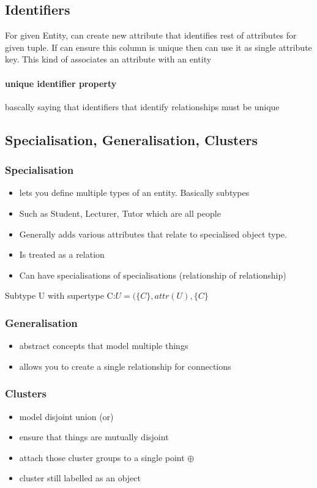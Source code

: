 \documentclass{article}
\newcommand\tab[1][0.5cm]{\hspace*{#1}}
\begin{document}
	\subsection{Identifiers}
		For given Entity, can create new attribute that identifies rest of attributes for given tuple. If can ensure this column is unique then can use it as single attribute key. This kind of associates an attribute with an entity

		\paragraph{unique identifier property} bascally saying that identifiers that identify relationships must be unique

	\subsection{Specialisation, Generalisation, Clusters}
		\subsubsection{Specialisation}
			\begin{itemize}
				\item lets you define multiple types of an entity. Basically subtypes
				\item Such as Student, Lecturer, Tutor which are all people
				\item Generally adds various attributes that relate to specialised object type.
				\item Is treated as a relation
				\item Can have specialisations of specialisations (relationship of relationship)
			\end{itemize}

			Subtype U with supertype C:\tab\tab $U = (\{C\}, attr(U),\{C\}$

		\subsubsection{Generalisation}
			\begin{itemize}
				\item abstract concepts that model multiple things
				\item allows you to create a single relationship for connections
			\end{itemize}

		\subsubsection{Clusters}
			\begin{itemize}
				\item model disjoint union (or)
				\item ensure that things are mutually disjoint
				\item attach those cluster groups to a single point $\oplus$
				\item cluster still labelled as an object
			\end{itemize}
\end{document}
